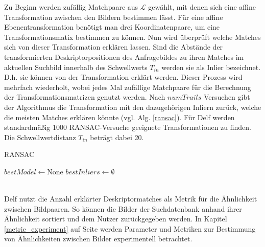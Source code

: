 Zu Beginn werden zufällig Matchpaare aus $\mathcal{L}$ gewählt, mit denen sich eine affine Transformation zwischen den Bildern bestimmen lässt. Für eine affine Ebenentransformation benötigt man drei Koordinatenpaare, um eine Transformationsmatix bestimmen zu können. Nun wird überprüft welche Matches sich von dieser Transformation erklären lassen. Sind die Abstände der transformierten Deskriptorpositionen des Anfragebildes zu ihren Matches im aktuellen Suchbild innerhalb des Schwellwerts $T_{in}$ werden sie als Inlier bezeichnet. D.h. sie können von der Transformation erklärt werden. Dieser Prozess wird mehrfach wiederholt, wobei jedes Mal zufällige Matchpaare für die Berechnung der Transformationsmatrizen genutzt werden.   Nach $numTrails$ Versuchen gibt der Algorithmus die Transformation mit den dazugehörigen Inliern zurück, welche die meisten Matches erklären könnte (vgl. Alg. \ref{ransac}). Für Delf werden standardmäßig 1000 RANSAC-Versuche geeignete Transformationen zu finden. Die Schwellwertdistanz $T_{in}$ beträgt dabei 20. 
\begin{algorithm}[h]
\caption{RANSAC}
\label{ransac}
\DontPrintSemicolon
{}
$bestModel \leftarrow \text{None}$ \;
$bestInliers \leftarrow \emptyset$ \;
 \;
\end{algorithm}
\\
Delf nutzt die Anzahl erklärter Deskriptormatches als Metrik für die Ähnlichkeit zwischen Bildpaaren. So können die Bilder der Suchdatenbank anhand ihrer Ähnlichkeit sortiert und dem Nutzer zurückgegeben werden. In Kapitel \ref{metric_experiment} auf Seite \pageref{metric_experiment} werden Parameter und Metriken zur Bestimmung von Ähnlichkeiten zwischen Bilder experimentell betrachtet. 


